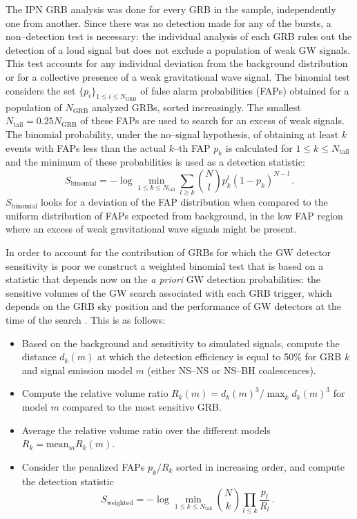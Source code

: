 The IPN GRB analysis was done for every GRB in the sample, independently one from another. Since there was no detection made for any of the bursts, a non--detection test is necessary: the individual analysis of each GRB rules out the detection of a loud signal but does not exclude a population of weak GW signals. This test accounts for any individual deviation from the background distribution or for a collective presence of a weak gravitational wave signal. The binomial test considers the set $\{p_i\}_{1 \leq i \leq  N_\text{GRB}}$ of false alarm probabilities (FAPs) obtained for a population of $N_\text{GRB}$ analyzed GRBs, sorted increasingly. The smallest $N_\text{tail} = 0.25 N_\text{GRB}$ of these FAPs are used to search for an excess of weak signals. The binomial probability, under the no--signal hypothesis, of obtaining at least $k$ events with FAPs less than the actual $k$--th FAP $p_k$ is calculated for $1 \leq k \leq N_\text{tail} $ and the minimum of these probabilities is used as a detection statistic:
%
\begin{equation}
S_\text{binomial} =  -\log \min_{1\leq k \leq N_\text{tail}} \sum_{l\geq k} \binom{N}{l} p_k^l
  (1-p_k)^{N-l} \, .
\end{equation}
%
$S_\text{binomial}$ looks for a deviation of the FAP distribution when compared to the uniform distribution of FAPs expected from background, in the low FAP region where an excess of weak gravitational wave signals might be present. 

In order to account for the contribution of GRBs for which the GW detector sensitivity is poor we construct a weighted binomial test that is based on a statistic that depends now on the \emph{a priori} GW detection probabilities: the sensitive volumes of the GW search associated with each GRB trigger, which depends on the GRB sky position and the performance of GW detectors at the time of the search \cite{lvc:s6grb}. This is as follows:
%
\begin{itemize}
\item Based on the background and sensitivity to simulated signals, compute the
  distance $d_k(m)$ at which the detection efficiency is equal to 50\%
  for GRB $k$ and signal emission model $m$ (either NS--NS or NS--BH coalescences).
\item Compute the relative volume ratio $R_k(m) = d_k(m)^3/\max_k
  d_k(m)^3$ for model $m$ compared to the most sensitive GRB.
\item Average the relative volume ratio over the different models
  $R_k = \textrm{mean}_{m} R_k(m)$.
\item Consider the penalized FAPs $p_k/R_k$ sorted in increasing
  order, and compute the detection statistic
  \begin{equation}
    S_\text{weighted} = -\log \min_{1\leq k \leq N_\text{tail}} 
  \binom{N}{k}\prod_{l \leq k}\frac{p_l}{R_l} \, .
  \end{equation}
\end{itemize}

